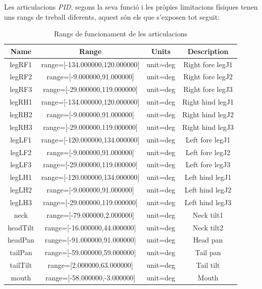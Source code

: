 \documentclass[12pt,a4paper,final,twoside]{report}
\begin{document}
Les articulacions \textit{PID}, segons la seva funció i les pròpies limitacions físiques tenen uns rangs de treball diferents, aquest són els que s'exposen tot seguit: 

\begin{table}[tb]
\begin{center}
\begin{tabular}{| c | c | c | c |}
\hline
Name & Range & Units & Description\\ \hline \hline
legRF1    &    range=[-134.000000,120.000000]  & unit=deg & Right fore legJ1\\
legRF2    &    range=[-9.000000,91.000000]     & unit=deg & Right fore legJ2\\
legRF3    &    range=[-29.000000,119.000000]   & unit=deg & Right fore legJ3\\
legRH1    &    range=[-134.000000,120.000000]  & unit=deg & Right hind legJ1\\
legRH2    &    range=[-9.000000,91.000000]     & unit=deg & Right hind legJ2\\
legRH3    &    range=[-29.000000,119.000000]   & unit=deg & Right hind legJ3\\
legLF1    &    range=[-120.000000,134.000000]  & unit=deg & Left fore legJ1\\
legLF2    &    range=[-9.000000,91.000000]     & unit=deg & Left fore legJ2\\
legLF3    &    range=[-29.000000,119.000000]   & unit=deg & Left fore legJ3\\
legLH1    &    range=[-120.000000,134.000000]  & unit=deg & Left hind legJ1\\
legLH2    &    range=[-9.000000,91.000000]     & unit=deg & Left hind legJ2\\
legLH3    &    range=[-29.000000,119.000000]   & unit=deg & Left hind legJ3\\
neck      &    range=[-79.000000,2.000000]     & unit=deg & Neck tilt1\\
headTilt  &    range=[-16.000000,44.000000]    & unit=deg & Neck tilt2\\
headPan   &    range=[-91.000000,91.000000]    & unit=deg & Head pan\\
tailPan   &    range=[-59.000000,59.000000]    & unit=deg & Tail pan\\
tailTilt  &    range=[2.000000,63.000000]      & unit=deg & Tail tilt\\
mouth     &    range=[-58.000000,-3.000000]    & unit=deg & Mouth\\
\hline
\end{tabular}
\end{center}
\caption{Rangs de funcionament de les articulacions \cite{Urbi_Docs}}
\label{Taula-rangs-articulacions}
\end{table}
\end{document}
